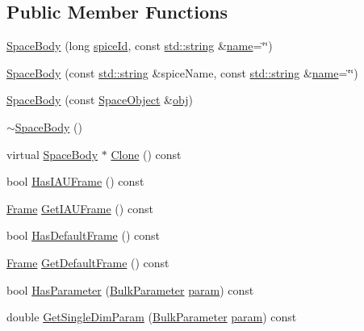 \subsection*{Public Member Functions}
\begin{DoxyCompactItemize}
\item 
\hyperlink{class_space_body_a91bf206403f3f1e9e5a940693a27da58}{Space\+Body} (long \hyperlink{class_space_object_a841dd12234c1861d3c1978035c9d7b8d}{spice\+Id}, const \hyperlink{glext_8h_ae84541b4f3d8e1ea24ec0f466a8c568b}{std\+::string} \&\hyperlink{glext_8h_ad977737dfc9a274a62741b9500c49a32}{name}=\char`\"{}\char`\"{})
\item 
\hyperlink{class_space_body_a92a9cc41eb5c681fa3755bca9ec8ffc5}{Space\+Body} (const \hyperlink{glext_8h_ae84541b4f3d8e1ea24ec0f466a8c568b}{std\+::string} \&spice\+Name, const \hyperlink{glext_8h_ae84541b4f3d8e1ea24ec0f466a8c568b}{std\+::string} \&\hyperlink{glext_8h_ad977737dfc9a274a62741b9500c49a32}{name}=\char`\"{}\char`\"{})
\item 
\hyperlink{class_space_body_a4c744f1048b7f3b6a21e56a106791a41}{Space\+Body} (const \hyperlink{class_space_object}{Space\+Object} \&\hyperlink{glext_8h_a0c0d4701a6c89f4f7f0640715d27ab26}{obj})
\item 
\hyperlink{class_space_body_a218ec46693291ac05c434322525fb3af}{$\sim$\+Space\+Body} ()
\item 
virtual \hyperlink{class_space_body}{Space\+Body} $\ast$ \hyperlink{class_space_body_abb3a8167a17c31d8aa0a4250ad8ebc2a}{Clone} () const 
\item 
bool \hyperlink{class_space_body_a2d9a7c988b1451e2bf8cdb6ffed70011}{Has\+I\+A\+U\+Frame} () const 
\item 
\hyperlink{class_frame}{Frame} \hyperlink{class_space_body_a88cff28dd1d28613d94b2fc00994316b}{Get\+I\+A\+U\+Frame} () const 
\item 
bool \hyperlink{class_space_body_a5bf8f002b9e19bedb46f1accf75caaa8}{Has\+Default\+Frame} () const 
\item 
\hyperlink{class_frame}{Frame} \hyperlink{class_space_body_ae775f995eaa5a5467d6065be2f98f397}{Get\+Default\+Frame} () const 
\item 
bool \hyperlink{class_space_body_a40614e7d85560093d9260005a310a281}{Has\+Parameter} (\hyperlink{class_space_body_aac4475090a05b2f6d9c833f071c9bcac}{Bulk\+Parameter} \hyperlink{glext_8h_ac7c896d55e93a6cf7ff8524005b4e7b4}{param}) const 
\item 
double \hyperlink{class_space_body_aa9c61cb125d77e2fab3db00766db3510}{Get\+Single\+Dim\+Param} (\hyperlink{class_space_body_aac4475090a05b2f6d9c833f071c9bcac}{Bulk\+Parameter} \hyperlink{glext_8h_ac7c896d55e93a6cf7ff8524005b4e7b4}{param}) const 

\end{DoxyCompactItemize}
